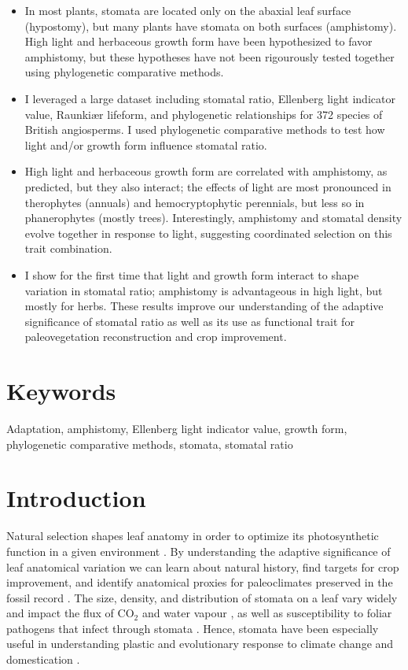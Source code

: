 \documentclass[12pt, oneside]{article}
\begin{document}
\begin{itemize}
	\item In most plants, stomata are located only on the abaxial leaf surface (hypostomy), but many plants have stomata on both surfaces (amphistomy). High light and herbaceous growth form have been hypothesized to favor amphistomy, but these hypotheses have not been rigourously tested together using phylogenetic comparative methods.
	\item I leveraged a large dataset including stomatal ratio, Ellenberg light indicator value, Raunki\ae r lifeform, and phylogenetic relationships for 372 species of British angiosperms. I used phylogenetic comparative methods to test how light and/or growth form influence stomatal ratio.
	\item High light and herbaceous growth form are correlated with amphistomy, as predicted, but they also interact; the effects of light are most pronounced in therophytes (annuals) and hemocryptophytic perennials, but less so in phanerophytes (mostly trees). Interestingly, amphistomy and stomatal density evolve together in response to light, suggesting coordinated selection on this trait combination.
	\item I show for the first time that light and growth form interact to shape variation in stomatal ratio; amphistomy is advantageous in high light, but mostly for herbs. These results improve our understanding of the adaptive significance of stomatal ratio as well as its use as functional trait for paleovegetation reconstruction and crop improvement.
\end{itemize}

\section*{Keywords}

Adaptation, amphistomy, Ellenberg light indicator value, growth form, phylogenetic comparative methods, stomata, stomatal ratio

\section*{Introduction}

Natural selection shapes leaf anatomy in order to optimize its photosynthetic function in a given environment \citep{Haberlandt_1914, Givnish_1987, Smith_etal_1997}. By understanding the adaptive significance of leaf anatomical variation we can learn about natural history, find targets for crop improvement, and identify anatomical proxies for paleoclimates preserved in the fossil record \citep[e.g.][]{Wolfe_1971, Royer_2001, McElwain_Steinthorsdottir_2017}. The size, density, and distribution of stomata on a leaf vary widely and impact the flux of CO$_2$ and water vapour \citep[recently reviewed in][]{Sack_Buckley_2016}, as well as susceptibility to foliar pathogens that infect through stomata \citep{Mckown_etal_2014, Melotto_etal_2017}. Hence, stomata have been especially useful in understanding plastic and evolutionary response to climate change and domestication \citep{Woodward_1987, Beerling_Royer_2011, Milla_etal_2013}.
\end{document}
